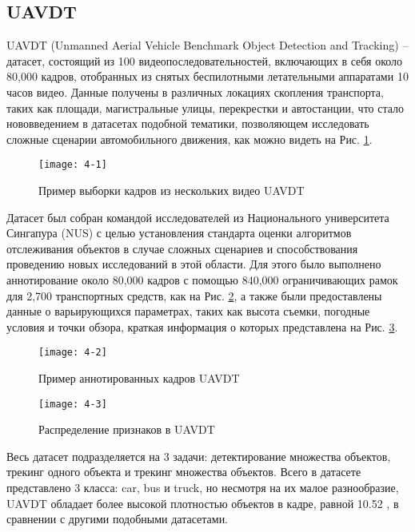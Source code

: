 \subsection{UAVDT}

UAVDT (Unmanned Aerial Vehicle Benchmark Object Detection and Tracking) \cite{4-1} -- датасет, состоящий из 100 видеопоследовательностей, включающих в себя около 80,000 кадров, отобранных из снятых беспилотными летательными аппаратами 10 часов видео. Данные получены в различных локациях скопления транспорта, таких как площади, магистральные улицы, перекрестки и автостанции, что стало нововведением в датасетах подобной тематики, позволяющем исследовать сложные сценарии автомобильного движения, как можно видеть на Рис. \ref{img:4-1}.

\vspace{0.5cm}

\begin{figure}[ht]
    \centering
    \texttt{[image: 4-1]}
    \caption{Пример выборки кадров из нескольких видео UAVDT}
    \label{img:4-1}
\end{figure}

Датасет был собран командой исследователей из Национального университета Сингапура (NUS) с целью установления стандарта оценки алгоритмов отслеживания объектов в случае сложных сценариев и способствования проведению новых исследований в этой области. Для этого было выполнено аннотирование около 80,000 кадров с помощью 840,000 ограничивающих рамок для 2,700 транспортных средств, как на Рис. \ref{img:4-2}, а также были предоставлены данные о варьирующихся параметрах, таких как высота съемки, погодные условия и точки обзора, краткая информация о которых представлена на Рис. \ref{img:4-3}.

\begin{figure}[ht]
    \centering
    \texttt{[image: 4-2]}
    \caption{Пример аннотированных кадров UAVDT}
    \label{img:4-2}
\end{figure}

\begin{figure}[ht]
    \centering
    \texttt{[image: 4-3]}
    \caption{Распределение признаков в UAVDT}
    \label{img:4-3}
\end{figure}

Весь датасет подразделяется на 3 задачи: детектирование множества объектов, трекинг одного объекта и трекинг множества объектов. Всего в датасете представлено 3 класса: car, bus и truck, но несмотря на их малое разнообразие, UAVDT обладает более высокой плотностью объектов в кадре, равной 10.52 \cite{4-2}, в сравнении с другими подобными датасетами.
